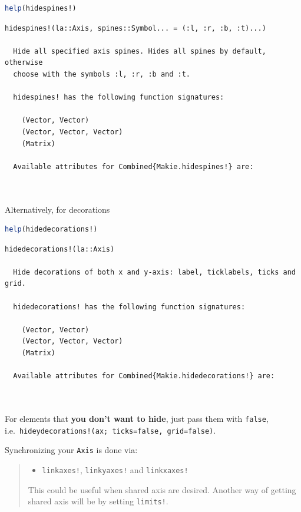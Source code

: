 \documentclass[
  notoc %
]{tufte-book}
\providecommand{\tightlist}{%
  \setlength{\itemsep}{0pt}\setlength{\parskip}{0pt}
}
\newcommand{\passthrough}[1]{#1}
\begin{document}
\begin{lstlisting}[language=Julia]
help(hidespines!)
\end{lstlisting}

\begin{lstlisting}[language=Output]
  hidespines!(la::Axis, spines::Symbol... = (:l, :r, :b, :t)...)

  Hide all specified axis spines. Hides all spines by default, otherwise
  choose with the symbols :l, :r, :b and :t.

  hidespines! has the following function signatures:

    (Vector, Vector)
    (Vector, Vector, Vector)
    (Matrix)

  Available attributes for Combined{Makie.hidespines!} are:

  
\end{lstlisting}

Alternatively, for decorations

\begin{lstlisting}[language=Julia]
help(hidedecorations!)
\end{lstlisting}

\begin{lstlisting}[language=Output]
  hidedecorations!(la::Axis)

  Hide decorations of both x and y-axis: label, ticklabels, ticks and grid.

  hidedecorations! has the following function signatures:

    (Vector, Vector)
    (Vector, Vector, Vector)
    (Matrix)

  Available attributes for Combined{Makie.hidedecorations!} are:

  
\end{lstlisting}

For elements that \textbf{you don't want to hide}, just pass them with
\passthrough{\lstinline!false!},
i.e.~\passthrough{\lstinline"hideydecorations!(ax; ticks=false, grid=false)"}.

Synchronizing your \passthrough{\lstinline!Axis!} is done via:

\begin{quote}
\begin{itemize}
\tightlist
\item
  \passthrough{\lstinline"linkaxes!"},
  \passthrough{\lstinline"linkyaxes!"} and
  \passthrough{\lstinline"linkxaxes!"}
\end{itemize}

This could be useful when shared axis are desired. Another way of
getting shared axis will be by setting
\passthrough{\lstinline"limits!"}.
\end{quote}
\end{document}
